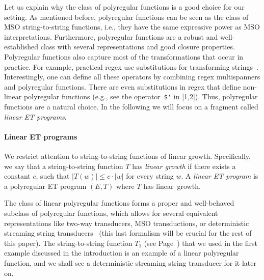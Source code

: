 \documentclass[
a4paper
]{article}
\theoremstyle{plain}
\theoremstyle{definition}
\theoremstyle{remark}
\begin{document}
Let us explain why the class of polyregular functions is a good choice for our setting. As mentioned before, polyregular functions can be seen as the class of MSO string-to-string functions, i.e., they have the same expressive power as MSO interpretations. Furthermore, polyregular functions are a robust and well-established class with several representations and good closure properties. Polyregular functions also capture most of the transformations that occur in practice. For example, practical regex use substitutions for transforming strings~\cite{substitution1,substitution2}. Interestingly, one can define all these operators by combining regex multispanners and polyregular functions. There are even substitutions in regex that define non-linear polyregular functions (e.g., see the operator~\verb*|$'| in [1,2]). Thus, polyregular functions are a natural choice. In the following we will focus on a fragment called \emph{linear ET programs}.

\paragraph{Linear ET programs}
We restrict attention to string-to-string functions of linear growth.
Specifically, we say that a string-to-string function $T$ has \emph{linear growth} if there exists a constant $c$, such that $|T(w)| \leq c \cdot |w|$ for every string $w$.
A \emph{linear ET program} is a polyregular ET program $(E,T)$ where $T$ has linear~growth. 

The class of linear polyregular functions forms a proper and well-behaved subclass of polyregular functions, which
allows for several equivalent representations like two-way
transducers, MSO transductions, or deterministic streaming string
transducers~\cite{Bojanczyk22,AlurC10}
(this last formalism will be crucial for the rest of this paper).
The string-to-string function $T_1$ (see Page~\pageref{T1Function})
that we used in the first example discussed in the introduction is an example of a linear polyregular function, and we shall see a deterministic streaming string transducer for it later on.
\end{document}

